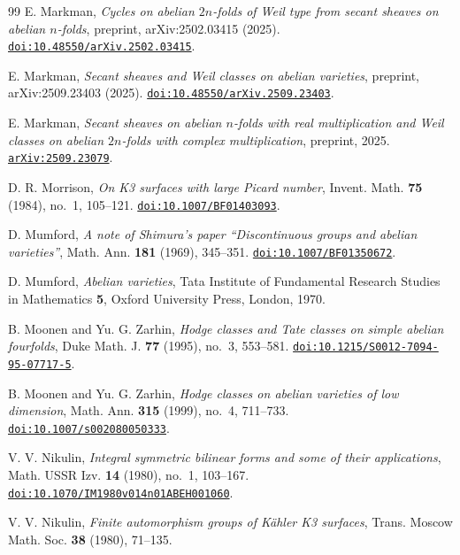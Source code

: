 \begin{thebibliography}{99}
E. Markman,
\emph{Cycles on abelian $2n$-folds of Weil type from secant sheaves on abelian
$n$-folds}, preprint, arXiv:2502.03415 (2025).
\href{https://doi.org/10.48550/arXiv.2502.03415}{\nolinkurl{doi:10.48550/arXiv.2502.03415}}.

E. Markman,
\emph{Secant sheaves and Weil classes on abelian varieties},
preprint, arXiv:2509.23403 (2025).
\href{https://doi.org/10.48550/arXiv.2509.23403}{\nolinkurl{doi:10.48550/arXiv.2509.23403}}.

E. Markman,
\emph{Secant sheaves on abelian $n$-folds with real multiplication and Weil
classes on abelian $2n$-folds with complex multiplication},
preprint, 2025.
\href{https://arxiv.org/abs/2509.23079}{\nolinkurl{arXiv:2509.23079}}.

D. R. Morrison,
\emph{On K3 surfaces with large Picard number},
Invent. Math. \textbf{75} (1984), no.~1, 105--121.
\href{https://doi.org/10.1007/BF01403093}{\nolinkurl{doi:10.1007/BF01403093}}.

D. Mumford,
\emph{A note of Shimura's paper ``Discontinuous groups and abelian
varieties''},
Math. Ann. \textbf{181} (1969), 345--351.
\href{https://doi.org/10.1007/BF01350672}{\nolinkurl{doi:10.1007/BF01350672}}.

D. Mumford,
\emph{Abelian varieties},
Tata Institute of Fundamental Research Studies in Mathematics \textbf{5}, Oxford University Press, London, 1970.

B. Moonen and Yu. G. Zarhin,
\emph{Hodge classes and Tate classes on simple abelian fourfolds},
Duke Math. J. \textbf{77} (1995), no.~3, 553--581.
\href{https://doi.org/10.1215/S0012-7094-95-07717-5}{\nolinkurl{doi:10.1215/S0012-7094-95-07717-5}}.

B. Moonen and Yu. G. Zarhin,
\emph{Hodge classes on abelian varieties of low dimension},
Math. Ann. \textbf{315} (1999), no.~4, 711--733.
\href{https://doi.org/10.1007/s002080050333}{\nolinkurl{doi:10.1007/s002080050333}}.

V. V. Nikulin,
\emph{Integral symmetric bilinear forms and some of their applications},
Math. USSR Izv. \textbf{14} (1980), no.~1, 103--167.
\href{https://doi.org/10.1070/IM1980v014n01ABEH001060}{\nolinkurl{doi:10.1070/IM1980v014n01ABEH001060}}.

V. V. Nikulin,
\emph{Finite automorphism groups of K\"ahler K3 surfaces},
Trans. Moscow Math. Soc. \textbf{38} (1980), 71--135.


\end{thebibliography}
